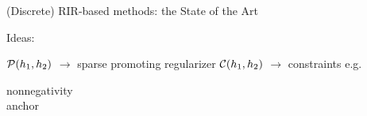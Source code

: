 \begin{frame}{(Discrete) RIR-based methods: the State of the Art \hfill\faBook}
\begin{block}{Ideas:}
\begin{enumerate}
\begin{mysotablock}
            \vspace*{-2mm}
            \begin{center}
                \footnotesize
                $\mathcal{P}(h_1, h_2)$ $\longrightarrow$ sparse promoting regularizer
                \hspace{5mm} \footnotesize $\mathcal{C}(h_1, h_2)$ $\longrightarrow$ constraints e.g. \parbox{6em}{nonnegativity\\anchor}
            \end{center}
        \end{mysotablock}
    \end{enumerate}
    \end{block}

    \vspace{-12mm}
    \begin{block}{}
        \begin{center}
            \footnotesize
            \textcolor{mygreen}{\cmark}  \cite{tong1994blind} \qquad \textcolor{mygreen}{\cmark}  \cite{lin2008blind} \qquad \textcolor{mygreen}{\cmark} \cite{aissa2008blind} \\
            \textcolor{mygreen}{\cmark} \cite{kowalczyk2013blind} \qquad \textcolor{mygreen}{\cmark} \cite{crocco2016estimation}
        \end{center}
    \end{block}

 \end{frame}


